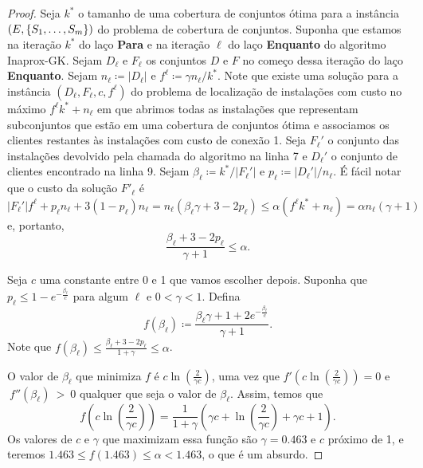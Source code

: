 \begin{proof}
Seja $k^*$ o tamanho de uma cobertura de conjuntos ótima para a instância $(E,\{S_1,\ldots,S_m\})$ do problema de cobertura de conjuntos. Suponha que estamos na iteração $k^*$ do laço {\bf Para} e na iteração $\ell$ do laço {\bf Enquanto} do algoritmo {\sc Inaprox-GK}.
Sejam $D_\ell$ e $F_\ell$ os conjuntos $D$ e $F$ no começo dessa iteração do laço {\bf Enquanto}. Sejam $n_\ell \coloneqq |D_\ell|$ e $f^\ell \coloneqq \gamma n_\ell /k^*$. Note que existe uma solução para a instância $(D_\ell,F_\ell,c,f^\ell)$ do problema de localização de instalações com custo no máximo $f^\ell k^* + n_\ell$ em que abrimos todas as instalações que representam subconjuntos que estão em uma cobertura de conjuntos ótima e associamos os clientes restantes às instalações com custo de conexão 1.
Seja $F_\ell'$ o conjunto das instalações devolvido pela chamada do algoritmo na linha 7 e $D_\ell'$ o conjunto de clientes encontrado na linha 9. Sejam $\beta_\ell \coloneqq k^*/|F_\ell'|$ e $p_\ell \coloneqq |D_\ell'|/n_\ell $. É fácil notar que o custo da solução $F'_\ell$ é
\[ |F_\ell'| f^\ell+ p_\ell n_\ell + 3 (1-p_\ell) n_\ell = n_\ell(\beta_\ell \gamma + 3 - 2p_\ell) \leq \alpha ( f^\ell k^* + n_\ell) = \alpha n_\ell (\gamma + 1)\]
e, portanto, 
\begin{equation} 
    \label{inaprox:beta}
\frac{\beta_\ell + 3 - 2p_\ell}{\gamma + 1} \leq \alpha.
\end{equation}

Seja $c$ uma constante entre 0 e 1 que vamos escolher depois. Suponha que $p_\ell \leq 1 - e^{-\frac{\beta_\ell}{c}}$ para algum $\ell$ e $0 < \gamma < 1$. Defina 
\[f(\beta_\ell) \coloneqq \frac{\beta_\ell \gamma + 1 + 2e^{-\frac{\beta_\ell}{c}}}{\gamma + 1}.\]
Note que $f(\beta_\ell) \leq \frac{\beta_\ell + 3 - 2p_\ell}{1 + \gamma} \leq \alpha$.

O valor de $\beta_\ell$ que minimiza $f$ é $c\ln(\frac{2}{\gamma c})$, uma vez que $f'(c\ln(\frac{2}{\gamma c})) = 0$ e $~f''(\beta_\ell)~>~0$ qualquer que seja o valor de $\beta_\ell$. Assim, temos que 
\[f(c\ln\left(\frac{2}{\gamma c}\right)) = \frac{1}{1+\gamma} \left( \gamma c + \ln\left(\frac{2}{\gamma c}\right) + \gamma c + 1 \right).\]
Os valores de $c$ e $\gamma$ que maximizam essa função são $\gamma = 0.463$ e $c$ próximo de 1, e teremos $1.463 \leq f(1.463) \leq \alpha < 1.463$, o que é um absurdo.


\end{proof}
